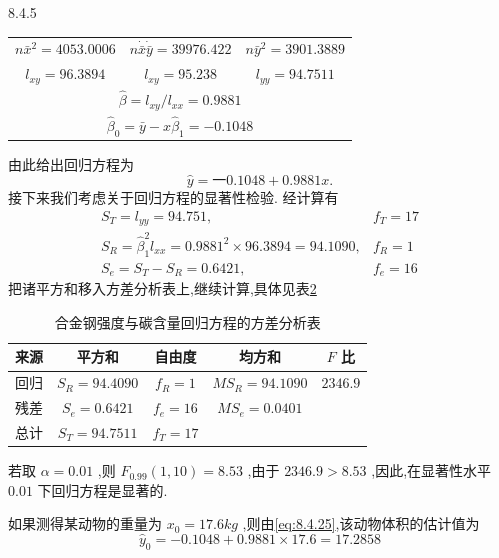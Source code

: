 \begin{example}{}{8.4.5}
\begin{table}[htbp]
\begin{tabular}{ccc}
         $n\bar{x}^2=4053.0006$   &    $n\dot \bar{x}\dot \bar{y}=39976.422$     &  $n\bar{y}^2=3901.3889$  \\
         $l_{xy}=96.3894$   &    $l_{xy}=95.238$     &  $l_{yy}=94.7511$  \\
            \multicolumn{3}{c}{ $\hat{\beta}=l_{xy}/l_{xx}=0.9881$ } \\
            \multicolumn{3}{c}{ $\hat{\beta}_0=\bar{y}-x\hat{\beta}_1=-0.1048$ } \\
        \end{tabular}%
        \label{tab:8.4.5}%
    \end{table}%
    由此给出回归方程为
    \begin{equation*}
    \hat{y}=一0.1048+0.9881x. \label{eq:8.4.25}
    \end{equation*}
    接下来我们考虑关于回归方程的显著性检验. 经计算有
    \begin{equation}
    \begin{array}{ll}{S_{T}=l_{y y}=94.751,} & {f_{T}=17} \\ {S_{R}=\hat{\beta}_{1}^{2} l_{x x}=0.9881^{2} \times 96.3894=94.1090,} & {f_{R}=1} \\ {S_{e}=S_{T}-S_{R}=0.6421,} & {f_{e}=16}\end{array}
    \end{equation}
    把诸平方和移入方差分析表上,继续计算,具体见表\ref{tab:8.4.6}
    \begin{table}[htbp]
        \centering
        \caption{合金钢强度与碳含量回归方程的方差分析表}
        \begin{tabular}{ccccc}
            \toprule
            来源    &  平方和  & 自由度   & 均方和   & $ F$ 比 \\\midrule %
            回归    &  $S_R=94.4090$  & $ f_R=1$   &  $MS_R=94.1090$  &  $2346.9$  \\
            残差    &  $S_e=0.6421$  &  $f_e=16$  &  $MS_e=0.0401$  &  \\\midrule
            总计    &  $S_T=94.7511$  &  $f_T=17$  &       &  \\\bottomrule
        \end{tabular}%
        \label{tab:8.4.6}%
    \end{table}%
    若取 $\alpha=0.01$ ,则 $F_{0.99}(1,10)=8.53$ ,由于 $2346.9>8.53$ ,因此,在显著性水平 $0.01$ 下回归方程是显著的.
    
    如果测得某动物的重量为 $x_0=17.6kg$ ,则由\ref{eq:8.4.25},该动物体积的估计值为
    \begin{equation}
    \hat{y}_{0}=-0.1048+0.9881 \times 17.6=17.2858
    \end{equation}
    

\end{example}
